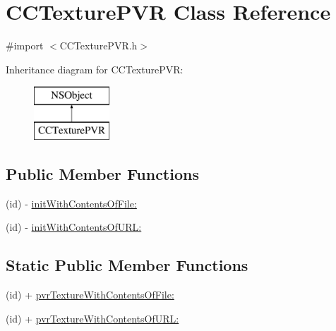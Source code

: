 \hypertarget{interface_c_c_texture_p_v_r}{\section{C\-C\-Texture\-P\-V\-R Class Reference}
\label{interface_c_c_texture_p_v_r}
}


{\ttfamily \#import $<$C\-C\-Texture\-P\-V\-R.\-h$>$}

Inheritance diagram for C\-C\-Texture\-P\-V\-R\-:\begin{figure}[H]
\begin{center}
\leavevmode
\includegraphics[height=2.000000cm]{interface_c_c_texture_p_v_r}
\end{center}
\end{figure}
\subsection*{Public Member Functions}
\begin{DoxyCompactItemize}
\item 
(id) -\/ \hyperlink{interface_c_c_texture_p_v_r_a58b55d2450e67b28ea4468d7282d4fea}{init\-With\-Contents\-Of\-File\-:}
\item 
(id) -\/ \hyperlink{interface_c_c_texture_p_v_r_a9b66c0ace5148c2655924f968b68a628}{init\-With\-Contents\-Of\-U\-R\-L\-:}
\end{DoxyCompactItemize}
\subsection*{Static Public Member Functions}
\begin{DoxyCompactItemize}
\item 
(id) + \hyperlink{interface_c_c_texture_p_v_r_aa686c345455353e7b465569901ec854f}{pvr\-Texture\-With\-Contents\-Of\-File\-:}
\item 
(id) + \hyperlink{interface_c_c_texture_p_v_r_a3443f0a73727a62647899082d0e3602e}{pvr\-Texture\-With\-Contents\-Of\-U\-R\-L\-:}
\end{DoxyCompactItemize}
